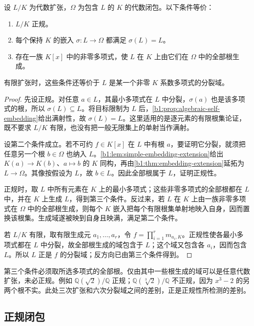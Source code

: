 \begin{theorem}\label{b1:thm:normal-embedding-criterion}
	设 \(L/K\) 为代数扩张，\(\Omega\) 为包含 \(L\) 的 \(K\) 的代数闭包。以下条件等价：
	\begin{enumerate}
		\item \(L/K\) 正规。
		\item 每个保持 \(K\) 的嵌入 \(\sigma:L\rightarrow\Omega\) 都满足 \(\sigma(L)=L\)。
		\item 存在一族 \(K[x]\) 中的非零多项式，使 \(L\) 在 \(K\) 上由它们在 \(\Omega\) 中的全部根生成。
	\end{enumerate}
	有限扩张时，这些条件还等价于 \(L\) 是某一个非零 \(K\) 系数多项式的分裂域。
\end{theorem}
\begin{proof}
	先设正规。对任意 \(a\in L\)，其最小多项式在 \(L\) 中分裂，\(\sigma(a)\) 也是该多项式的根，所以 \(\sigma(L)\subseteq L\)。将目标限制为 \(L\) 后，\cref{b1:prop:algebraic-self-embedding}给出满射性，故 \(\sigma(L)=L\)。这里适用的是逐元素的有限根集论证，既不要求 \(L/K\) 有限，也没有把一般无限集上的单射当作满射。

	设第二个条件成立。若不可约 \(f\in K[x]\) 在 \(L\) 中有根 \(a\)，要证明它分裂，就须把任意另一个根 \(b\in\Omega\) 也纳入 \(L\)。\cref{b1:lem:simple-embedding-extension}给出 \(K(a)\rightarrow K(b)\)、\(a\mapsto b\) 的 \(K\) 同构，再由\cref{b1:thm:embedding-extension}延拓为 \(L\rightarrow\Omega\)。其像按假设为 \(L\)，故 \(b\in L\)。因此全部根属于 \(L\)，证明正规性。

	正规时，取 \(L\) 中所有元素在 \(K\) 上的最小多项式；这些非零多项式的全部根都在 \(L\) 中，并在 \(K\) 上生成 \(L\)，得到第三个条件。反过来，若 \(L\) 在 \(K\) 上由一族非零多项式在 \(\Omega\) 中的全部根生成，则每个 \(K\) 嵌入把每个有限根集单射地映入自身，因而置换该根集。生成域遂被映到自身且映满，满足第二个条件。

	若 \(L/K\) 有限，取有限生成元 \(a_1,\ldots,a_r\)，令 \(f=\prod_{i=1}^r m_{a_i,K}\)。正规性使各最小多项式都在 \(L\) 中分裂，故全部根生成的域包含于 \(L\)；这个域又包含各 \(a_i\)，因而包含 \(L\)。所以 \(L\) 正是 \(f\) 的分裂域；反方向已由第三个条件得到。
\end{proof}
第三个条件必须取所选多项式的全部根。仅由其中一些根生成的域可以是任意代数扩张，未必正规。例如 \(\mathbb Q(\sqrt2)/\mathbb Q\) 正规；\(\mathbb Q(\sqrt[3]2)/\mathbb Q\) 不正规，因为 \(x^3-2\) 的另两个根不实。此处三次扩张和六次分裂域之间的差别，正是正规性所检测的差别。

\subsection{正规闭包}
\label{b1:subsec:1503:02}

